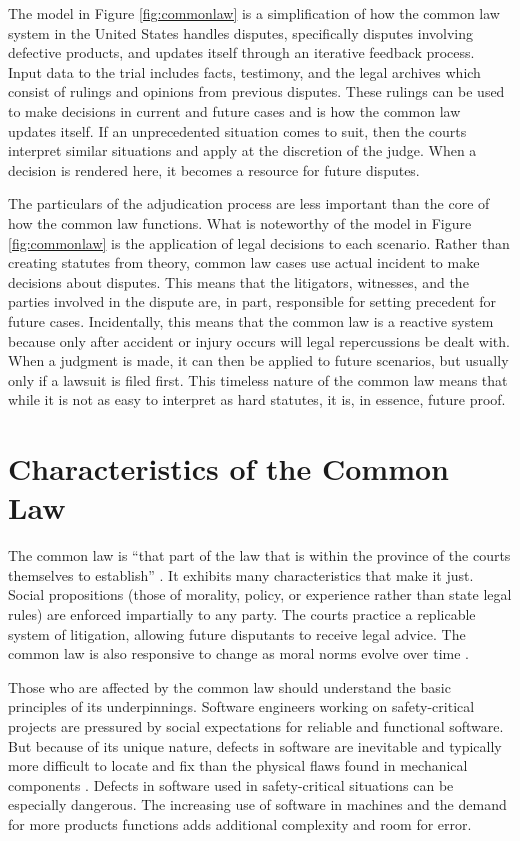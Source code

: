 \documentclass[12pt]{report}
\begin{document}
The model in Figure \ref{fig:commonlaw} is a simplification of how the common law system in the United States handles disputes, specifically disputes involving defective products, and updates itself through an iterative feedback process. Input data to the trial includes facts, testimony, and the legal archives which consist of rulings and opinions from previous disputes. These rulings can be used to make decisions in current and future cases and is how the common law updates itself. If an unprecedented situation comes to suit, then the courts interpret similar situations and apply at the discretion of the judge. When a decision is rendered here, it becomes a resource for future disputes.

The particulars of the adjudication process are less important than the core of how the common law functions. What is noteworthy of the model in Figure \ref{fig:commonlaw} is the application of legal decisions to each scenario. Rather than creating statutes from theory, common law cases use actual incident to make decisions about disputes. This means that the litigators, witnesses, and the parties involved in the dispute are, in part, responsible for setting precedent for future cases. Incidentally, this means that the common law is a reactive system because only after accident or injury occurs will legal repercussions be dealt with. When a judgment is made, it can then be applied to future scenarios, but usually only if a lawsuit is filed first. This timeless nature of the common law means that while it is not as easy to interpret as hard statutes, it is, in essence, future proof.

\section{Characteristics of the Common Law} 

The common law is ``that part of the law that is within the province of the courts themselves to establish'' \cite{FAKE}. It exhibits many characteristics that make it just. Social propositions (those of morality, policy, or experience rather than state legal rules) are enforced impartially to any party. The courts practice a replicable system of litigation, allowing future disputants to receive legal advice. The common law is also responsive to change as moral norms evolve over time \cite{FAKE}. 

Those who are affected by the common law should understand the basic principles of its underpinnings. Software engineers working on safety-critical projects are pressured by social expectations for reliable and functional software. But because of its unique nature, defects in software are inevitable and typically more difficult to locate and fix than the physical flaws found in mechanical components \cite{Parnas90}. Defects in software used in safety-critical situations can be especially dangerous. The increasing use of software in machines and the demand for more products functions adds additional complexity and room for error.
\end{document}
